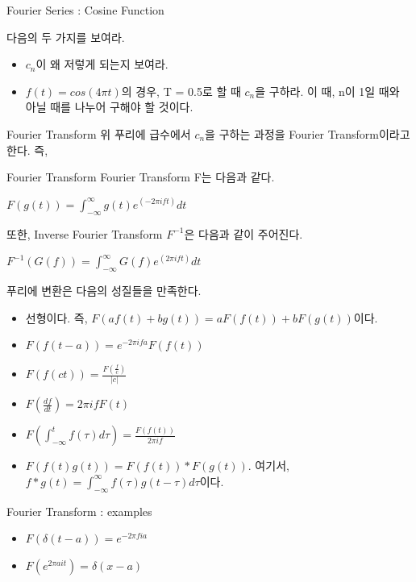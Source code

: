 \documentclass{beamer}
\begin{document}
\begin{frame}{Fourier Series : Cosine Function} 

다음의 두 가지를 보여라. 

\begin{itemize} 
\item $c_n$이 왜 저렇게 되는지 보여라. 
\item $f(t) = cos(4\pi t )$의 경우, T = 0.5로 할 때 $c_n$을 구하라. 이 때, n이 1일 때와 아닐 때를 나누어 구해야 할 것이다. 
\end{itemize}
\end{frame}

\begin{frame}[allowframebreaks]{Fourier Transform} 
위 푸리에 급수에서 $c_n$을 구하는 과정을 Fourier Transform이라고 한다. 즉, 
\begin{block}{Fourier Transform}
Fourier Transform F는 다음과 같다. 

$F(g(t)) = \int^{\infty}_{-\infty} g(t) e^(-2 \pi i f t) dt$ 

또한, Inverse Fourier Transform $F^{-1}$은 다음과 같이 주어진다. 

$F^{-1}(G(f)) = \int^{\infty}_{-\infty} G(f) e^(2 \pi i f t) dt$ 
\end{block}

푸리에 변환은 다음의 성질들을 만족한다. 

\begin{itemize} 
\item 선형이다. 즉, $F(af(t) + bg(t)) = aF(f(t)) + bF(g(t))$이다. 
\item $F(f(t-a)) = e^{-2 \pi i f a} F(f(t))$ 
\item $F(f(ct)) = \frac{F(\frac{f}{c})}{|c|}$
\item $F(\frac{df}{dt}) = 2 \pi i f F(t)$ 
\item $F(\int^{t}_{-\infty} f(\tau) d\tau) = \frac{F(f(t))}{2 \pi i f }$
\item $F(f(t)g(t)) = F(f(t)) * F(g(t))$. 여기서, $f*g(t) = \int^{\infty}_{-\infty}f(\tau) g(t-\tau) d\tau$이다. 
\end{itemize}
\end{frame}

\begin{frame}{Fourier Transform : examples}
\begin{itemize}  
\item $F(\delta(t-a)) = e^{-2 \pi f i a}$
\item $F(e^{2 \pi a i t} ) = \delta(x-a)$
\end{itemize} 
\end{frame}
\end{document}
